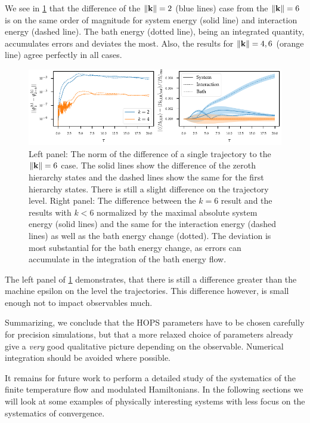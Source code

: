 We see in \cref{fig:k_systematics_system} that the difference of the
\(\norm{\vb{k}} = 2\) (blue lines) case from the \(\norm{\vb{k}} = 6\)
is on the same order of magnitude for system energy (solid line) and
interaction energy (dashed line). The bath energy (dotted line), being
an integrated quantity, accumulates errors and deviates the
most. Also, the results for \(\norm{\vb{k}} = 4,6\) (orange line)
agree perfectly in all cases.
\begin{figure}[htp]
  \centering
  \includegraphics{figs/one_bath_syst/k_systematics_system}
  \caption{\label{fig:k_systematics_system} Left panel: The norm of
    the difference of a single trajectory to the \(\norm{\vb{k}} = 6\)
    case. The solid lines show the difference of the zeroth hierarchy
    states and the dashed lines show the same for the first hierarchy
    states.  There is still a slight difference on the trajectory
    level. Right panel: The difference between the \(k=6\) result and
    the results with \(k<6\) normalized by the maximal absolute system
    energy (solid lines) and the same for the interaction energy
    (dashed lines) as well as the bath energy change (dotted). The
    deviation is most substantial for the bath energy change, as
    errors can accumulate in the integration of the bath energy flow.}
\end{figure}
The left panel of \cref{fig:k_systematics_system} demonstrates, that
there is still a difference greater than the machine epsilon on the
level the trajectories. This difference however, is small enough not
to impact observables much.

Summarizing, we conclude that the HOPS parameters have to be chosen
carefully for precision simulations, but that a more relaxed choice of
parameters already give a \emph{very} good qualitative picture
depending on the observable. Numerical integration should be avoided
where possible.

 It remains for future work
to perform a detailed study of the systematics of the finite
temperature flow and modulated Hamiltonians. In the following sections
we will look at some examples of physically interesting systems with
less focus on the systematics of convergence.

